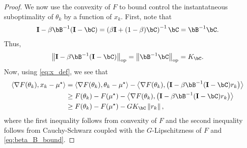 \begin{proof}
     We now use the convexity of $F$ to bound control  the instantatneous suboptimality of $\theta_k$ by a function of $x_k$.  First, note that
     \begin{align}
        \eye - \beta \bB^{-1} (\eye - \bC) = \left( \beta \eye + (1 - \beta) \bC \right)^{-1} \bC = \bB^{-1} \bC.
     \end{align}
     Thus,
     \begin{align}\label{eq:beta_B_bound}
        \normop{\eye - \beta \bB^{-1} (\eye - \bC)} = \normop{\bB^{-1} \bC} = K_{\bC}.
     \end{align}
     Now, using \eqref{eq:x_def}, we see that
     \begin{align}
        \inprod{\nabla F(\theta_k)}{x_k - \mustar} &= \inprod{\nabla F(\theta_k)}{\theta_k - \mustar} - \inprod{\nabla F(\theta_k)}{\left( \eye - \beta \bB^{-1}(\eye - \bC) r_k \right)} \\
        &\geq F(\theta_k) - F(\mustar) - \inprod{\nabla F(\theta_k)}{\left( \eye - \beta \bB^{-1}(\eye - \bC) r_k \right)} \\
        &\geq F(\theta_k) - F(\mustar) - G K_{\bC} \norm{r_k},
     \end{align}
     where the first inequality follows from convexity of $F$ and the second inequality follows from Cauchy-Schwarz coupled with the $G$-Lipschitzness of $F$ and \eqref{eq:beta_B_bound}.


\end{proof}

